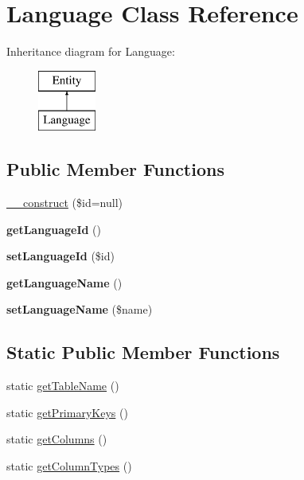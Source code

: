 \hypertarget{classLanguage}{
\section{Language Class Reference}
\label{classLanguage}
}
Inheritance diagram for Language:\begin{figure}[H]
\begin{center}
\leavevmode
\includegraphics[height=2.000000cm]{classLanguage}
\end{center}
\end{figure}
\subsection*{Public Member Functions}
\begin{DoxyCompactItemize}
\item 
\hyperlink{classLanguage_abc1d723ee7724d0b7a6b27914e8e6d55}{\_\-\_\-construct} (\$id=null)
\item 
\hypertarget{classLanguage_ae8b3c5092853212ca93c29c3af395326}{
{\bfseries getLanguageId} ()}
\label{classLanguage_ae8b3c5092853212ca93c29c3af395326}

\item 
\hypertarget{classLanguage_a367ceec7d9d2c011c15c5e296d8188a0}{
{\bfseries setLanguageId} (\$id)}
\label{classLanguage_a367ceec7d9d2c011c15c5e296d8188a0}

\item 
\hypertarget{classLanguage_a4db7f3dd4e44138175adc1d6447e7f6f}{
{\bfseries getLanguageName} ()}
\label{classLanguage_a4db7f3dd4e44138175adc1d6447e7f6f}

\item 
\hypertarget{classLanguage_afa72381cb58b086ff6bcc08c4fbe582f}{
{\bfseries setLanguageName} (\$name)}
\label{classLanguage_afa72381cb58b086ff6bcc08c4fbe582f}

\end{DoxyCompactItemize}
\subsection*{Static Public Member Functions}
\begin{DoxyCompactItemize}
\item 
static \hyperlink{classLanguage_a262653445a1324d6c02099e01cab0dff}{getTableName} ()
\item 
static \hyperlink{classLanguage_ad85ca28f29f19ec96d0151d21a2485a6}{getPrimaryKeys} ()
\item 
static \hyperlink{classLanguage_aca9b17402d92635b3092d255ca90e551}{getColumns} ()
\item 
static \hyperlink{classLanguage_a6e5cf86376e603ee4945b514fb6de7bd}{getColumnTypes} ()
\end{DoxyCompactItemize}
